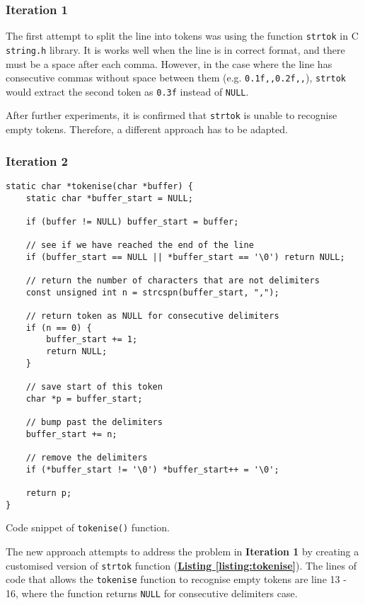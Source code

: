 \documentclass[12pt, a4paper]{article}
\begin{document}
\subsubsection*{Iteration 1}
The first attempt to split the line into tokens was using the function \texttt{strtok} in C
\texttt{string.h} library. It is works well when the line is in correct format, and there
must be a space after each comma. However, in the case where the line has consecutive commas without
space between them (e.g. \texttt{0.1f,,0.2f,,}), \texttt{strtok} would extract the
second token as \texttt{0.3f} instead of \texttt{NULL}.

After further experiments, it is confirmed that \texttt{strtok} is unable to recognise empty
tokens. Therefore, a different approach has to be adapted.

\subsubsection*{Iteration 2}
\begin{listing}[ht]
\begin{verbatim}
static char *tokenise(char *buffer) {
    static char *buffer_start = NULL;

    if (buffer != NULL) buffer_start = buffer;

    // see if we have reached the end of the line
    if (buffer_start == NULL || *buffer_start == '\0') return NULL;

    // return the number of characters that are not delimiters
    const unsigned int n = strcspn(buffer_start, ",");

    // return token as NULL for consecutive delimiters
    if (n == 0) {
        buffer_start += 1;
        return NULL;
    }

    // save start of this token
    char *p = buffer_start;

    // bump past the delimiters
    buffer_start += n;

    // remove the delimiters
    if (*buffer_start != '\0') *buffer_start++ = '\0';

    return p;
}
\end{verbatim}
\caption{Code snippet of \texttt{tokenise()} function.} \label{listing:tokenise}
\end{listing}

The new approach attempts to address the problem in \textbf{Iteration 1} by creating a customised
version of \texttt{strtok} function (\hyperref[listing:tokenise]{\textbf{Listing
\ref*{listing:tokenise}}}). The lines of code that allows the \texttt{tokenise} function to
recognise empty tokens are line 13 - 16, where the function returns \texttt{NULL} for
consecutive delimiters case.
\end{document}
